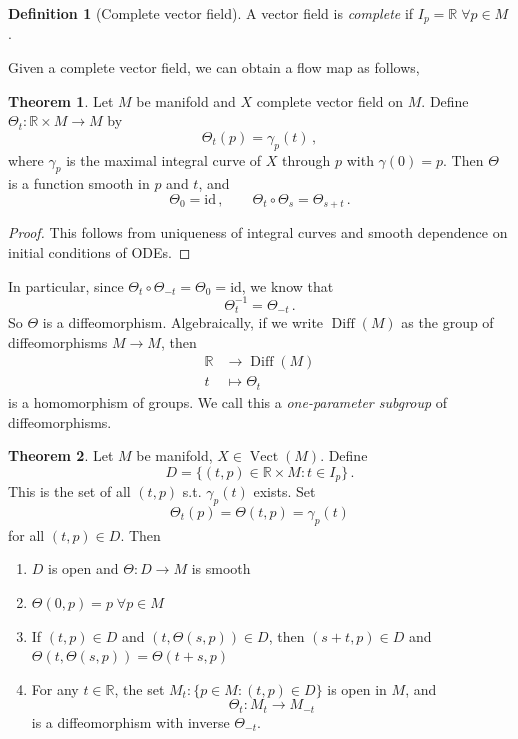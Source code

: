 \documentclass[a4paper,11pt]{article}
\theoremstyle{definition}
\newtheorem*{defn}{Definition}
\newtheorem*{thm}{Theorem}
\DeclareMathOperator{\Vect}{Vect}
\DeclareMathOperator{\Diff}{Diff}
\numberwithin{equation}{section}
\begin{document}
\begin{defn}[Complete vector field]
A vector field is \emph{complete} if $I_p=\mathbb{R}\;\forall p\in M$.
\end{defn}

Given a complete vector field, we can obtain a flow map as follows,

\begin{thm}
Let $M$ be manifold and $X$ complete vector field on $M$. Define $\Theta_t:\mathbb{R}\times M\rightarrow M$ by
\[
\Theta_t(p)=\gamma_p(t)\,,
\]
where $\gamma_p$ is the maximal integral curve of $X$ through $p$ with $\gamma(0)=p$. Then $\Theta$ is a function smooth in $p$ and $t$, and 
\[
\Theta_0=\text{id}\,,\qquad\Theta_t\circ\Theta_s=\Theta_{s+t}\,.
\]
\end{thm}

\begin{proof}
This follows from uniqueness of integral curves and smooth dependence on initial conditions of ODEs.
\end{proof}

In particular, since $\Theta_t\circ\Theta_{-t}=\Theta_0=\text{id}$, we know that
\[
\Theta^{-1}_t=\Theta_{-t}\,.
\]
So $\Theta$ is a diffeomorphism. Algebraically, if we write $\Diff(M)$ as the group of diffeomorphisms $M\rightarrow M$, then 
\begin{align*}
    \mathbb{R}&\rightarrow\Diff(M)\\
    t&\mapsto\Theta_t
\end{align*}
is a homomorphism of groups. We call this a \emph{one-parameter subgroup} of diffeomorphisms.

\begin{thm}
Let $M$ be manifold, $X\in\Vect(M)$. Define
\[
D=\{(t,p)\in\mathbb{R}\times M:t\in I_p\}\,.
\]
This is the set of all $(t,p)$ s.t. $\gamma_p(t)$ exists. Set
\[
\Theta_t(p)=\Theta(t,p)=\gamma_p(t)
\]
for all $(t,p)\in D$. Then
\begin{enumerate}
    \item $D$ is open and $\Theta: D\rightarrow M$ is smooth
    \item $\Theta(0,p)=p\;\forall p\in M$
    \item If $(t,p)\in D$ and $(t,\Theta(s,p))\in D$, then $(s+t,p)\in D$ and $\Theta(t,\Theta(s,p))=\Theta(t+s,p)$
    \item For any $t\in\mathbb{R}$, the set $M_t:\{p\in M:(t,p)\in D\}$ is open in $M$, and 
    \[
    \Theta_t:M_t\rightarrow M_{-t}
    \]
    is a diffeomorphism with inverse $\Theta_{-t}$.
\end{enumerate}
\end{thm}
\end{document}
